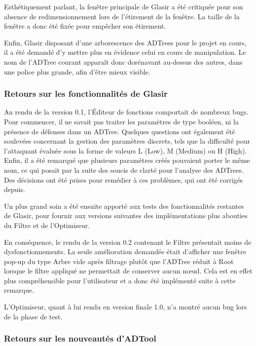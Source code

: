 Esthétiquement parlant, la fenêtre principale de Glasir a été critiquée pour son absence de redimensionnement lors de l'étirement de la fenêtre. La taille de la fenêtre a donc été fixée pour empêcher son étirement. 

Enfin, Glasir disposant d'une arborescence des ADTrees pour le projet en cours, il a été demandé d'y mettre plus en évidence celui en cours de manipulation. Le nom de l'ADTree courant apparaît donc dorénavant au-dessus des autres, dans une police plus grande, afin d'être mieux visible.

\subsubsection{Retours sur les fonctionnalités de Glasir}
\label{subsubsec:Glasir}

Au rendu de la version 0.1, l'Éditeur de fonctions comportait de nombreux bugs. Pour commencer, il ne savait pas traiter les paramètres de type booléen, ni la présence de défenses dans un ADTree. Quelques questions ont également été soulevées concernant la gestion des paramètres discrets, tels que la difficulté pour l'attaquant évaluée sous la forme de valeurs L (Low), M (Medium) ou H (High). Enfin, il a été remarqué que plusieurs paramètres créés pouvaient porter le même nom, ce qui posait par la suite des soucis de clarté pour l'analyse des ADTrees. Des décisions ont été prises pour remédier à ces problèmes, qui ont été corrigés depuis. 

Un plus grand soin a été ensuite apporté aux tests des fonctionnalités restantes de Glasir, pour fournir aux versions suivantes des implémentations plus abouties du Filtre et de l'Optimiseur. 

En conséquence, le rendu de la version 0.2 contenant le Filtre présentait moins de dysfonctionnements. La seule amélioration demandée était d'afficher une fenêtre pop-up du type \og Arbre vide après filtrage \fg{} plutôt que l'ADTree réduit à \og Root \fg{} lorsque le filtre appliqué ne permettait de conserver aucun n\oe{}ud. Cela est en effet plus compréhensible pour l'utilisateur et a donc été implémenté suite à cette remarque.

L'Optimiseur, quant à lui rendu en version finale 1.0, n'a montré aucun bug lors de la phase de test.

\subsubsection{Retours sur les nouveautés d'ADTool}
\label{subsubsec:ADTool}

